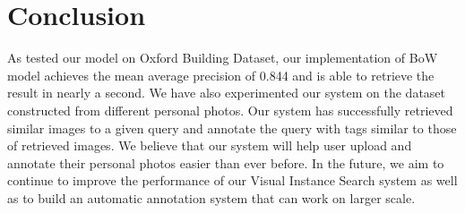 \section{Conclusion}
\label{section:conclusion}

As tested our model on Oxford Building Dataset, our implementation of BoW model achieves the mean average precision of 0.844 and is able to retrieve the result in nearly a second. We have also experimented our system on the dataset constructed from different personal photos. Our system has successfully retrieved similar images to a given query and annotate the query with tags similar to those of retrieved images. We believe that our system will help user upload and annotate their personal photos easier than ever before. In the future, we aim to continue to improve the performance of our Visual Instance Search system as well as to build an automatic annotation system that can work on larger scale.  
